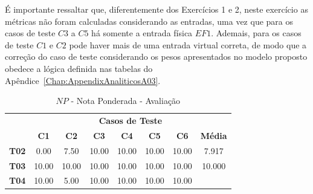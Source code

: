 É importante ressaltar que, diferentemente dos Exercícios 1 e 2, neste exercício as métricas não foram calculadas considerando as entradas, uma vez que para os casos de teste $C3$ a $C5$ há somente a entrada física $EF1$. Ademais, para os casos de teste $C1$ e $C2$ pode haver mais de uma entrada virtual correta, de modo que a correção do caso de teste considerando os pesos apresentados no modelo proposto obedece a lógica definida nas tabelas do Apêndice~\ref{Chap:AppendixAnaliticosA03}.

\begin{table}[htbp]
	\centering
	\caption{$NP$ - Nota Ponderada - Avaliação}
	\begin{tabular}{|c|ccccccc|}
		\hline
		\rowcolor[HTML]{D0CECE} 
		\cellcolor[HTML]{D0CECE} &
		\multicolumn{7}{c|}{\cellcolor[HTML]{D0CECE}\textbf{Casos de Teste}} \\ \cline{2-8} 
		\rowcolor[HTML]{D9D9D9} 
		\multirow{-2}{*}{\cellcolor[HTML]{D0CECE}\textbf{Participante}} &
		\multicolumn{1}{c|}{\cellcolor[HTML]{D9D9D9}\textbf{C1}} &
		\multicolumn{1}{c|}{\cellcolor[HTML]{D9D9D9}\textbf{C2}} &
		\multicolumn{1}{c|}{\cellcolor[HTML]{D9D9D9}\textbf{C3}} &
		\multicolumn{1}{c|}{\cellcolor[HTML]{D9D9D9}\textbf{C4}} &
		\multicolumn{1}{c|}{\cellcolor[HTML]{D9D9D9}\textbf{C5}} &
		\multicolumn{1}{c|}{\cellcolor[HTML]{D9D9D9}\textbf{C6}} &
		\textbf{Média} \\ \hline
		\textbf{T02} &
		\multicolumn{1}{c|}{\cellcolor[HTML]{FFFFFF}0.00} &
		\multicolumn{1}{c|}{\cellcolor[HTML]{FFFFFF}7.50} &
		\multicolumn{1}{c|}{\cellcolor[HTML]{FFFFFF}10.00} &
		\multicolumn{1}{c|}{\cellcolor[HTML]{FFFFFF}10.00} &
		\multicolumn{1}{c|}{\cellcolor[HTML]{FFFFFF}10.00} &
		\multicolumn{1}{c|}{\cellcolor[HTML]{FFFFFF}10.00} &
		7.917 \\ \hline
		\rowcolor[HTML]{F2F2F2} 
		\textbf{T03} &
		\multicolumn{1}{c|}{\cellcolor[HTML]{F2F2F2}10.00} &
		\multicolumn{1}{c|}{\cellcolor[HTML]{F2F2F2}10.00} &
		\multicolumn{1}{c|}{\cellcolor[HTML]{F2F2F2}10.00} &
		\multicolumn{1}{c|}{\cellcolor[HTML]{F2F2F2}10.00} &
		\multicolumn{1}{c|}{\cellcolor[HTML]{F2F2F2}10.00} &
		\multicolumn{1}{c|}{\cellcolor[HTML]{F2F2F2}10.00} &
		10.000 \\ \hline
		\textbf{T04} &
		\multicolumn{1}{c|}{\cellcolor[HTML]{FFFFFF}10.00} &
		\multicolumn{1}{c|}{\cellcolor[HTML]{FFFFFF}5.00} &
		\multicolumn{1}{c|}{\cellcolor[HTML]{FFFFFF}10.00} &
		\multicolumn{1}{c|}{\cellcolor[HTML]{FFFFFF}10.00} &
		\multicolumn{1}{c|}{\cellcolor[HTML]{FFFFFF}10.00} &
		\multicolumn{1}{c|}{\cellcolor[HTML]{FFFFFF}10.00} &

\end{tabular}
\end{table}
